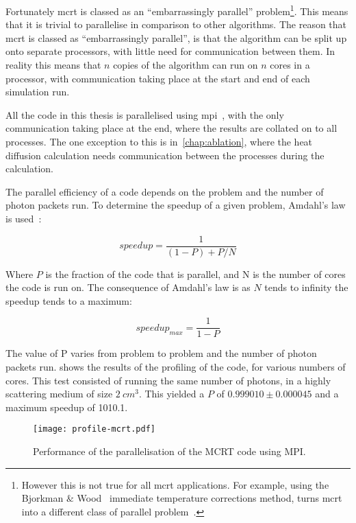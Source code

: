 Fortunately \gls*{mcrt} is classed as an ``embarrassingly parallel'' problem\footnote{However this is not true for all \gls*{mcrt} applications. For example, using the Bjorkman $\&$ Wood~\cite{bjorkman2001radiative} immediate temperature corrections method, turns \gls*{mcrt} into a different class of parallel problem~\cite{robitaille2011hyperion}.}.
This means that it is trivial to parallelise in comparison to other algorithms. 
The reason that \gls*{mcrt} is classed as ``embarrassingly parallel'', is that the algorithm can be split up onto separate processors, with little need for communication between them. 
In reality this means that $n$ copies of the algorithm can run on $n$ cores in a processor, with communication taking place at the start and end of each simulation run. 

All the code in this thesis is parallelised using \gls*{mpi}~\cite{gropp2014using,gropp2014usingadv}, with the only communication taking place at the end, where the results are collated on to all processes.
The one exception to this is in~\cref{chap:ablation}, where the heat diffusion calculation needs communication between the processes during the calculation.

The parallel efficiency of a code depends on the problem and the number of photon packets run.
To determine the speedup of a given problem, Amdahl's law is used~\cite{amdahl1967validity}:

\begin{equation}
speedup = \frac{1}{(1-P)+P/N}
\end{equation}

Where $P$ is the fraction of the code that is parallel, and N is the number of cores the code is run on.
The consequence of Amdahl's law is as $N$ tends to infinity the speedup tends to a maximum:

\begin{equation}
speedup_{max}=\frac{1}{1-P}
\end{equation}

The value of P varies from problem to problem and the number of photon packets run.
 shows the results of the profiling of the code, for various numbers of cores.
This test consisted of running the same number of photons, in a highly scattering medium of size $2~cm^3$.
This yielded a $P$ of $0.999010 \pm 0.000045$ and a maximum speedup of 1010.1.


\begin{figure}[!ht]
	\centering
	\texttt{[image: profile-mcrt.pdf]}
	\caption{Performance of the parallelisation of the MCRT code using MPI.}
	\label{fig:paratest}
\end{figure}


